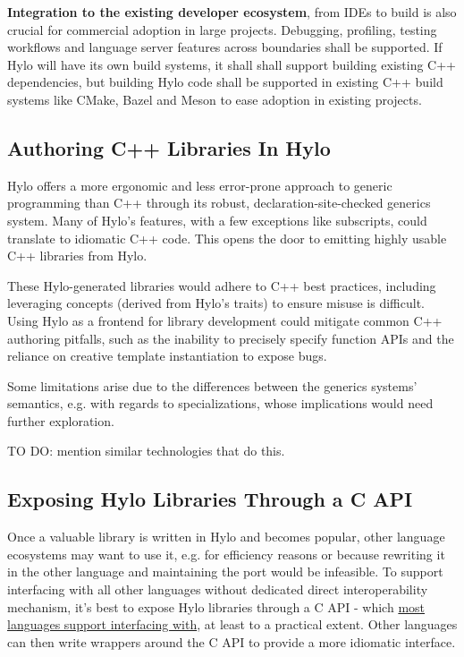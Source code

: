 \textbf{Integration to the existing developer ecosystem}, from IDEs to build is also crucial for commercial adoption in large projects. Debugging, profiling, testing workflows and language server features across boundaries shall be supported.\cite{requirements-for-cpp-successor-languages} If Hylo will have its own build systems, it shall shall support building existing C++ dependencies, but building Hylo code shall be supported in existing C++ build systems like CMake, Bazel and Meson to ease adoption in existing projects.

\subsection{Authoring C++ Libraries In Hylo}
Hylo offers a more ergonomic and less error-prone approach to generic programming than C++ through its robust, declaration-site-checked generics system. Many of Hylo's features, with a few exceptions like subscripts, could translate to idiomatic C++ code. This opens the door to emitting highly usable C++ libraries from Hylo.

These Hylo-generated libraries would adhere to C++ best practices, including leveraging concepts (derived from Hylo's traits) to ensure misuse is difficult. Using Hylo as a frontend for library development could mitigate common C++ authoring pitfalls, such as the inability to precisely specify function APIs and the reliance on creative template instantiation to expose bugs.

Some limitations arise due to the differences between the generics systems' semantics, e.g. with regards to specializations, whose implications would need further exploration.

TO DO: mention similar technologies that do this.

\subsection{Exposing Hylo Libraries Through a C API}

Once a valuable library is written in Hylo and becomes popular, other language ecosystems may want to use it, e.g. for efficiency reasons or because rewriting it in the other language and maintaining the port would be infeasible. To support interfacing with all other languages without dedicated direct interoperability mechanism, it's best to expose Hylo libraries through a C API - which \href{https://arxiv.org/abs/2411.08388}{most languages support interfacing with}, at least to a practical extent. Other languages can then write wrappers around the C API to provide a more idiomatic interface.


